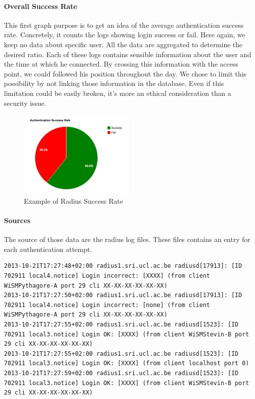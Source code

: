 \paragraph*{Overall Success Rate} This first graph purpose is to get an idea of the average authentication success rate. Concretely, it counts the logs showing login success or fail. Here again, we keep no data about specific user. All the data are aggregated to determine the desired ratio. Each of these logs contains sensible information about the user and the time at which he connected. By crossing this information with the access point, we could followed his position throughout the day. We chose to limit this possibility by not linking those information in the database. Even if this limitation could be easily broken, it's more an ethical consideration than a security issue.

\begin{figure}[H]
	\centering
   \includegraphics[width=0.5\textwidth]{Pictures/chapter5/radiusRate.png}
   \caption{Example of Radius Success Rate}
\end{figure} 

\paragraph*{Sources} The source of those data are the radius log files. These files contains an entry for each authentication attempt.

\begin{lstlisting}[frame=single,breaklines=true,caption={Radius logs}]
2013-10-21T17:27:48+02:00 radius1.sri.ucl.ac.be radiusd[17913]: [ID 702911 local4.notice] Login incorrect: [XXXX] (from client WiSMPythagore-A port 29 cli XX-XX-XX-XX-XX-XX)
2013-10-21T17:27:50+02:00 radius1.sri.ucl.ac.be radiusd[17913]: [ID 702911 local4.notice] Login incorrect: [none] (from client WiSMPythagore-A port 29 cli XX-XX-XX-XX-XX-XX)
2013-10-21T17:27:55+02:00 radius1.sri.ucl.ac.be radiusd[1523]: [ID 702911 local3.notice] Login OK: [XXXX] (from client WiSMStevin-B port 29 cli XX-XX-XX-XX-XX-XX)
2013-10-21T17:27:55+02:00 radius1.sri.ucl.ac.be radiusd[1523]: [ID 702911 local3.notice] Login OK: [XXXX] (from client localhost port 0)
2013-10-21T17:27:59+02:00 radius1.sri.ucl.ac.be radiusd[1523]: [ID 702911 local3.notice] Login OK: [XXXX] (from client WiSMStevin-B port 29 cli XX-XX-XX-XX-XX-XX)
\end{lstlisting}

